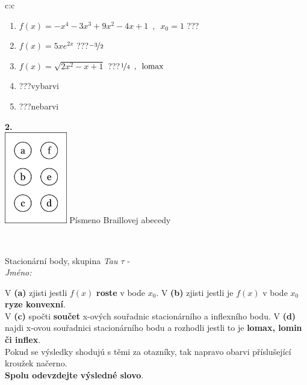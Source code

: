 \documentclass[10pt]{report}
\begin{document}
\begin{tabular}{c:c}
\begin{minipage}[c][104.5mm][t]{0.5\linewidth}
\begin{center}
\begin{minipage}{0.79\linewidth}
\begin{center}
\begin{varwidth}{\linewidth}
\begin{enumerate}
\item $f(x)=-x^4-3x^3+9x^2-4x+1\enspace , \enspace x_0=1$\quad \dotfill\; ???\;\dotfill \quad {}
\item $f(x)=5xe^{2x}$\quad \dotfill\; ???\;\dotfill \quad $\nicefrac{-3}{2}$
\item $f(x)=\sqrt{2x^2-x+1}$\quad \dotfill\; ???\;\dotfill \quad $\nicefrac{1}{4}\enspace , \enspace\mathrm{lomax}$
\item \quad \dotfill\; ???\;\dotfill \quad vybarvi
\item \quad \dotfill\; ???\;\dotfill \quad nebarvi
\end{enumerate}
\end{varwidth}
\end{center}
\end{minipage}
\begin{minipage}{0.20\linewidth}
\begin{center}
{\Huge\bfseries 2.} \\[2mm]
\includegraphics[height=40mm]{../images/braille.png}
{\small Písmeno Braillovej abecedy}
\end{center}
\end{minipage}
\end{center}
\end{minipage}
\\ \hdashline
\begin{minipage}[c][104.5mm][t]{0.5\linewidth}
\begin{center}
\vspace{7mm}
{\huge Stacionární body, skupina \textit{Tau $\tau$} -}\\[5mm]
\textit{Jméno:}\phantom{xxxxxxxxxxxxxxxxxxxxxxxxxxxxxxxxxxxxxxxxxxxxxxxxxxxxxxxxxxxxxxxxx}\\[5mm]
\begin{minipage}{0.95\linewidth}
\begin{center}
{\small V \textbf{(a)} zjisti jestli $f(x)$ \textbf{roste} v bode $x_0$. V \textbf{(b)} zjisti jestli je $f(x)$ v bode $x_0$ \textbf{ryze konvexní}.\\V \textbf{(c)} spočti \textbf{součet} x-ových souřadnic stacionárního a inflexního bodu. V \textbf{(d)} najdi x-ovou souřadnici stacionárního bodu a rozhodli jestli to je \textbf{lomax, lomin či inflex}.\\Pokud se výsledky shodujú s těmi za otazníky, tak napravo obarvi příslušející kroužek načerno.\\\textbf{Spolu odevzdejte výsledné slovo}}.

\end{center}
\end{minipage}
\end{center}
\end{minipage}
\end{tabular}
\end{document}
